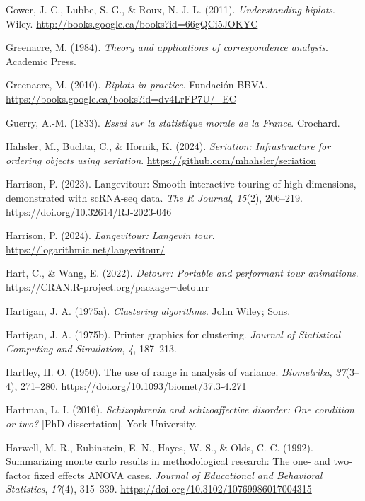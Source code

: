 \documentclass[
  letterpaper,
  10pt,
  krantz2]{krantz}
\newlength{\cslhangindent}
\newenvironment{CSLReferences}[2] %
 {\begin{list}{}{%
  \setlength{\itemindent}{0pt}
  \setlength{\leftmargin}{0pt}
  \setlength{\parsep}{0pt}
  \ifodd #1
   \setlength{\leftmargin}{\cslhangindent}
   \setlength{\itemindent}{-1\cslhangindent}
  \fi
  \setlength{\itemsep}{#2\baselineskip}}}
 {\end{list}}
\begin{document}
{\begin{CSLReferences}{1}{0}
Gower, J. C., Lubbe, S. G., \& Roux, N. J. L. (2011).
\emph{Understanding biplots}. Wiley.
\url{http://books.google.ca/books?id=66gQCi5JOKYC}

Greenacre, M. (1984). \emph{Theory and applications of correspondence
analysis}. Academic Press.

Greenacre, M. (2010). \emph{Biplots in practice}. Fundaci{ó}n BBVA.
\url{https://books.google.ca/books?id=dv4LrFP7U/_EC}

Guerry, A.-M. (1833). \emph{Essai sur la statistique morale de la
{France}}. Crochard.

Hahsler, M., Buchta, C., \& Hornik, K. (2024). \emph{Seriation:
Infrastructure for ordering objects using seriation}.
\url{https://github.com/mhahsler/seriation}

Harrison, P. (2023). Langevitour: Smooth interactive touring of high
dimensions, demonstrated with scRNA-seq data. \emph{The R Journal},
\emph{15}(2), 206--219. \url{https://doi.org/10.32614/RJ-2023-046}

Harrison, P. (2024). \emph{Langevitour: Langevin tour}.
\url{https://logarithmic.net/langevitour/}

Hart, C., \& Wang, E. (2022). \emph{Detourr: Portable and performant
tour animations}. \url{https://CRAN.R-project.org/package=detourr}

Hartigan, J. A. (1975a). \emph{Clustering algorithms}. John Wiley; Sons.

Hartigan, J. A. (1975b). Printer graphics for clustering. \emph{Journal
of Statistical Computing and Simulation}, \emph{4}, 187--213.

Hartley, H. O. (1950). The use of range in analysis of variance.
\emph{Biometrika}, \emph{37}(3--4), 271--280.
\url{https://doi.org/10.1093/biomet/37.3-4.271}

Hartman, L. I. (2016). \emph{Schizophrenia and schizoaffective disorder:
One condition or two?} {[}PhD dissertation{]}. York University.

Harwell, M. R., Rubinstein, E. N., Hayes, W. S., \& Olds, C. C. (1992).
Summarizing monte carlo results in methodological research: The one- and
two-factor fixed effects {ANOVA} cases. \emph{Journal of Educational and
Behavioral Statistics}, \emph{17}(4), 315--339.
\url{https://doi.org/10.3102/10769986017004315}


\end{CSLReferences}}
\end{document}
